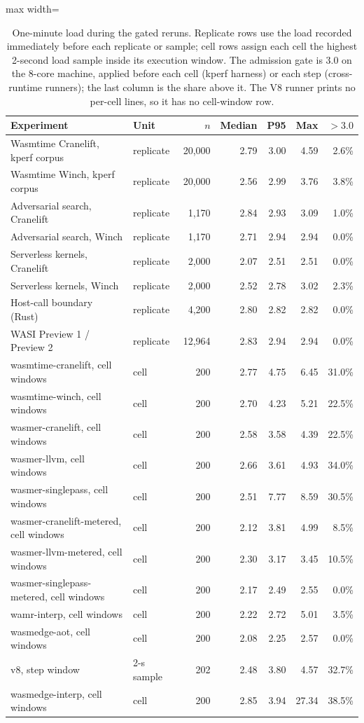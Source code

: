 \begin{table}[t]
\caption{One-minute load during the gated reruns. Replicate rows use the load recorded immediately before each replicate or sample; cell rows assign each cell the highest 2-second load sample inside its execution window. The admission gate is 3.0 on the 8-core machine, applied before each cell (kperf harness) or each step (cross-runtime runners); the last column is the share above it. The V8 runner prints no per-cell lines, so it has no cell-window row.}\label{tab:load}
\footnotesize
\setlength{\tabcolsep}{4pt}%
\begin{adjustbox}{max width=\textwidth}%
\begin{tabular}{llrrrrr}
\toprule
Experiment & Unit & $n$ & Median & P95 & Max & $>3.0$ \\
\midrule
Wasmtime Cranelift, kperf corpus & replicate & 20,000 & 2.79 & 3.00 & 4.59 & 2.6\% \\
Wasmtime Winch, kperf corpus & replicate & 20,000 & 2.56 & 2.99 & 3.76 & 3.8\% \\
Adversarial search, Cranelift & replicate & 1,170 & 2.84 & 2.93 & 3.09 & 1.0\% \\
Adversarial search, Winch & replicate & 1,170 & 2.71 & 2.94 & 2.94 & 0.0\% \\
Serverless kernels, Cranelift & replicate & 2,000 & 2.07 & 2.51 & 2.51 & 0.0\% \\
Serverless kernels, Winch & replicate & 2,000 & 2.52 & 2.78 & 3.02 & 2.3\% \\
Host-call boundary (Rust) & replicate & 4,200 & 2.80 & 2.82 & 2.82 & 0.0\% \\
WASI Preview 1 / Preview 2 & replicate & 12,964 & 2.83 & 2.94 & 2.94 & 0.0\% \\
wasmtime-cranelift, cell windows & cell & 200 & 2.77 & 4.75 & 6.45 & 31.0\% \\
wasmtime-winch, cell windows & cell & 200 & 2.70 & 4.23 & 5.21 & 22.5\% \\
wasmer-cranelift, cell windows & cell & 200 & 2.58 & 3.58 & 4.39 & 22.5\% \\
wasmer-llvm, cell windows & cell & 200 & 2.66 & 3.61 & 4.93 & 34.0\% \\
wasmer-singlepass, cell windows & cell & 200 & 2.51 & 7.77 & 8.59 & 30.5\% \\
wasmer-cranelift-metered, cell windows & cell & 200 & 2.12 & 3.81 & 4.99 & 8.5\% \\
wasmer-llvm-metered, cell windows & cell & 200 & 2.30 & 3.17 & 3.45 & 10.5\% \\
wasmer-singlepass-metered, cell windows & cell & 200 & 2.17 & 2.49 & 2.55 & 0.0\% \\
wamr-interp, cell windows & cell & 200 & 2.22 & 2.72 & 5.01 & 3.5\% \\
wasmedge-aot, cell windows & cell & 200 & 2.08 & 2.25 & 2.57 & 0.0\% \\
v8, step window & 2-s sample & 202 & 2.48 & 3.80 & 4.57 & 32.7\% \\
wasmedge-interp, cell windows & cell & 200 & 2.85 & 3.94 & 27.34 & 38.5\% \\
\bottomrule
\end{tabular}%
\end{adjustbox}
\end{table}
